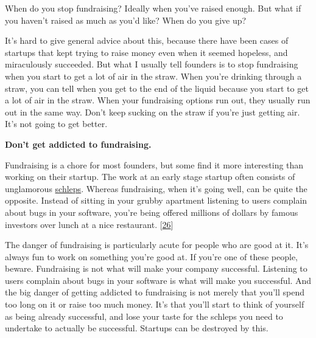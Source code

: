 When do you stop fundraising? Ideally when
                    you've raised enough. But what if you haven't raised as much
                    as you'd like? When do you give up?

It's hard to
                    give general advice about this, because there have been
                    cases of startups that kept trying to raise money even when
                    it seemed hopeless, and miraculously succeeded. But what I
                    usually tell founders is to stop fundraising when you start
                    to get a lot of air in the straw. When you're drinking
                    through a straw, you can tell when you get to the end of the
                    liquid because you start to get a lot of air in the straw.
                    When your fundraising options run out, they usually run out
                    in the same way. Don't keep sucking on the straw if you're
                    just getting air. It's not going to get better.


                    \textbf{Don't get addicted to fundraising.}

Fundraising is a chore for most founders, but
                    some find it more interesting than working on their startup.
                    The work at an early stage startup often consists of
                    unglamorous \href{http://www.paulgraham.com/schlep.html}{schleps}. Whereas
                    fundraising, when it's going well, can be quite the
                    opposite. Instead of sitting in your grubby apartment
                    listening to users complain about bugs in your software,
                    you're being offered millions of dollars by famous investors
                    over lunch at a nice restaurant.
                    [\href{\#f26n}{26}]

The danger of fundraising is particularly acute
                    for people who are good at it. It's always fun to work on
                    something you're good at. If you're one of these people,
                    beware. Fundraising is not what will make your company
                    successful. Listening to users complain about bugs in your
                    software is what will make you successful. And the big
                    danger of getting addicted to fundraising is not merely that
                    you'll spend too long on it or raise too much money. It's
                    that you'll start to think of yourself as being already
                    successful, and lose your taste for the schleps you need to
                    undertake to actually be successful. Startups can be
                    destroyed by this.

